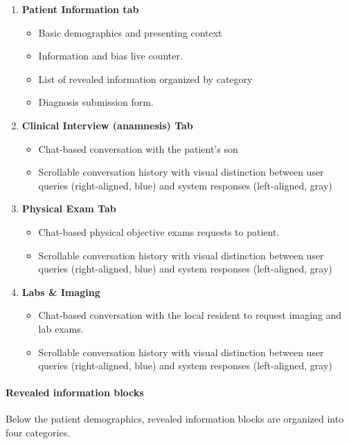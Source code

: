 \begin{enumerate}
  \item \textbf{Patient Information tab}
  \begin{itemize}
    \item Basic demographics and presenting context
    \item Information and bias live counter.
    \item List of revealed information organized by category
    \item Diagnosis submission form.
  \end{itemize}

  \item \textbf{Clinical Interview (anamnesis) Tab}
  \begin{itemize}
    \item Chat-based conversation with the patient's son
    \item Scrollable conversation history with visual distinction between user queries (right-aligned, blue) and system responses (left-aligned, gray)
  \end{itemize}

  \item \textbf{Physical Exam Tab}
  \begin{itemize}
    \item Chat-based physical objective exams requests to patient.
    \item Scrollable conversation history with visual distinction between user queries (right-aligned, blue) and system responses (left-aligned, gray)
  \end{itemize}


  \item \textbf{Labs \& Imaging}
  \begin{itemize}
    \item Chat-based conversation with the local resident to request imaging and lab exams.
    \item Scrollable conversation history with visual distinction between user queries (right-aligned, blue) and system responses (left-aligned, gray)
  \end{itemize}
\end{enumerate}


\paragraph{Revealed information blocks}

Below the patient demographics, revealed information blocks are organized into four categories.

